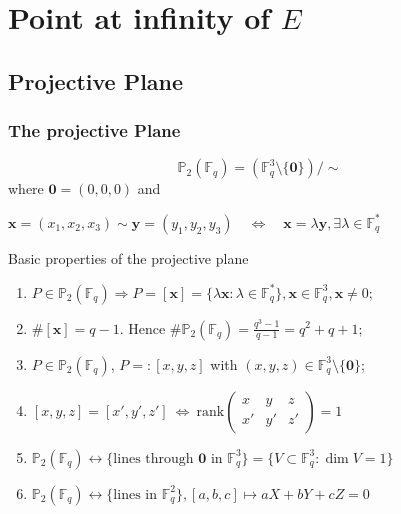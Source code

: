 \documentclass[10pt]{beamer} %
\newcommand{\F}{\mathbb F}
\theoremstyle{definition}
\begin{document}
\section{Point at infinity of \texorpdfstring{$E$}{E}}
\subsection{Projective Plane}
\begin{frame}
\frametitle{The projective Plane}

\begin{Definition}
$$\mathbb P_2(\F_q)=(\F_q^3\setminus\{\mathbf{0}\})/\sim$$
where $\mathbf{0}=(0,0,0)$ and
\centerline{$\mathbf{x}=(x_1,x_2,x_3)\sim \mathbf{y}=(y_1,y_2,y_3)\quad\Leftrightarrow\quad\mathbf{x}=\lambda\mathbf{y}, \exists\lambda\in\F_q^*$}
\end{Definition}\pause

\begin{beamerboxesrounded}[upper=block title example,lower=block body example,shadow=true]{Basic properties of the projective plane}
\begin{enumerate}[<+-| alert@+>]
 \item $P\in\mathbb P_2(\F_q) \Rightarrow P=[\mathbf{x}]=\{\lambda\mathbf{x}:\lambda\in\F_q^*\}, \mathbf{x}\in\F_q^3, \textbf{x}\neq0$;
 \item $\#[\mathbf{x}]=q-1$. Hence $\#\mathbb P_2(\F_q)=\frac{q^3-1}{q-1}=q^2+q+1;$
 \item $P\in \mathbb P_2(\F_q)$, $P=:[x,y,z]$ with $(x,y,z)\in \F_q^3\setminus\{\mathbf{0}\}$;
\item $[x,y,z]=[x',y',z']\ \Longleftrightarrow\ \text{rank}\begin{pmatrix}
                                 x&y&z\\ x'&y'&z'
                                \end{pmatrix}=1$
\item $\mathbb P_2(\F_q) \longleftrightarrow \{\text{lines through }\mathbf{0}\text{ in }\F_q^3\}= \{V\subset \F_q^3: \dim V=1\}$
\item $\mathbb P_2(\F_q) \longleftrightarrow \{\text{lines in }\F_q^2\}, [a,b,c]\mapsto aX+bY+cZ=0$
\end{enumerate}
\end{beamerboxesrounded}

\end{frame}
\end{document}
